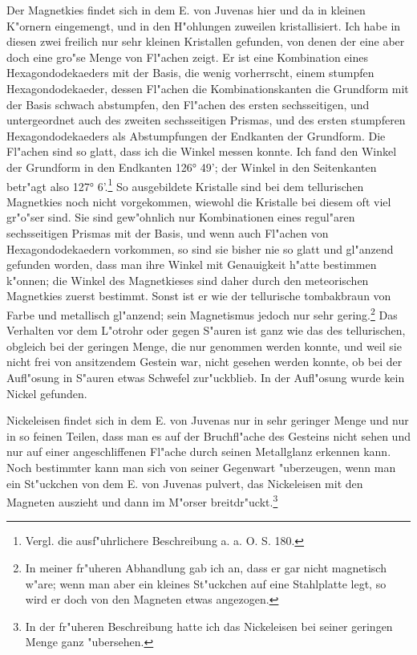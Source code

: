 \documentclass[a4paper, 11pt, oneside, german]{article}
\begin{document}
Der Magnetkies findet sich in dem E. von Juvenas hier und da in kleinen K"ornern eingemengt, und in den H"ohlungen zuweilen kristallisiert. Ich habe in diesen zwei freilich nur sehr kleinen Kristallen gefunden, von denen der eine aber doch eine gro"se Menge von Fl"achen zeigt. Er ist eine Kombination eines Hexagondodekaeders mit der Basis, die wenig vorherrscht, einem stumpfen Hexagondodekaeder, dessen Fl"achen die Kombinationskanten die Grundform mit der Basis schwach abstumpfen, den Fl"achen des ersten sechsseitigen, und untergeordnet auch des zweiten sechsseitigen Prismas, und des ersten stumpferen Hexagondodekaeders als Abstumpfungen der Endkanten der Grundform. Die Fl"achen sind so glatt, dass ich die Winkel messen konnte. Ich fand den Winkel der Grundform in den Endkanten 126° 49’; der Winkel in den Seitenkanten betr"agt also 127° 6’.\footnote{Vergl. die ausf"uhrlichere Beschreibung a. a. O. S. 180.} So ausgebildete Kristalle sind bei dem tellurischen Magnetkies noch nicht vorgekommen, wiewohl die Kristalle bei diesem oft viel gr"o"ser sind. Sie sind gew"ohnlich nur Kombinationen eines regul"aren sechsseitigen Prismas mit der Basis, und wenn auch Fl"achen von Hexagondodekaedern vorkommen, so sind sie bisher nie so glatt und gl"anzend gefunden worden, dass man ihre Winkel mit Genauigkeit h"atte bestimmen k"onnen; die Winkel des Magnetkieses sind daher durch den meteorischen Magnetkies zuerst bestimmt. Sonst ist er wie der tellurische tombakbraun von Farbe und metallisch gl"anzend; sein Magnetismus jedoch nur sehr gering.\footnote{In meiner fr"uheren Abhandlung gab ich an, dass er gar nicht magnetisch w"are; wenn man aber ein kleines St"uckchen auf eine Stahlplatte legt, so wird er doch von den Magneten etwas angezogen.} Das Verhalten vor dem L"otrohr oder gegen S"auren ist ganz wie das des tellurischen, obgleich bei der geringen Menge, die nur genommen werden konnte, und weil sie nicht frei von ansitzendem Gestein war, nicht gesehen werden konnte, ob bei der Aufl"osung in S"auren etwas Schwefel zur"uckblieb. In der Aufl"osung wurde kein Nickel gefunden.

Nickeleisen findet sich in dem E. von Juvenas nur in sehr geringer Menge und nur in so feinen Teilen, dass man es auf der Bruchfl"ache des Gesteins nicht sehen und nur auf einer angeschliffenen Fl"ache durch seinen Metallglanz erkennen kann. Noch bestimmter kann man sich von seiner Gegenwart "uberzeugen, wenn man ein St"uckchen von dem E. von Juvenas pulvert, das Nickeleisen mit den Magneten auszieht und dann im M"orser breitdr"uckt.\footnote{In der fr"uheren Beschreibung hatte ich das Nickeleisen bei seiner geringen Menge ganz "ubersehen.}
\end{document}
